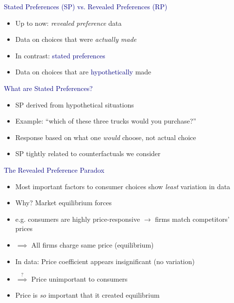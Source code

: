 \documentclass[aspectratio=169]{beamer}
\begin{document}
\begin{frame}

\textcolor{navy}{Stated Preferences (SP) vs. Revealed Preferences (RP)}

\bigskip

\begin{itemize}
\itemsep1.5em
\item<2-> Up to now: \textit{revealed preference} data
\item<3-> Data on choices that were \textit{actually made}
\item<4-> In contrast: \textcolor{navy}{stated preferences}
\item<5-> Data on choices that are \textcolor{navy}{hypothetically} made
\end{itemize}

\end{frame}

\begin{frame}

\textcolor{navy}{What are Stated Preferences?}

\bigskip

\begin{itemize}
\itemsep1.5em
\item<2-> SP derived from hypothetical situations
\item<3-> Example: ``which of these three trucks would you purchase?''
\item<4-> Response based on what one \textit{would} choose, not actual choice
\item<5-> SP tightly related to counterfactuals we consider
\end{itemize}

\end{frame}


\begin{frame}

\textcolor{navy}{The Revealed Preference Paradox}

\bigskip

\begin{itemize}
\itemsep1.25em
\item<2-> Most important factors to consumer choices show \textit{least} variation in data
\item<3-> Why? Market equilibrium forces
\item<4-> e.g. consumers are highly price-responsive $\to$ firms match competitors' prices
\item<5-> $\implies$ All firms charge same price (equilibrium)
\item<6-> In data: Price coefficient appears insignificant (no variation)
\item<7-> $\overset{?}{\implies}$ Price unimportant to consumers
\item<8-> Price is \textit{so} important that it created equilibrium
\end{itemize}

\end{frame}
\end{document}
